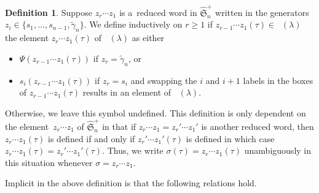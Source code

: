 \documentclass[10pt,a4paper]{amsart}
\numberwithin{equation}{section}
\theoremstyle{definition}
\newtheorem{Definition}[Theorem]{Definition}
\DeclareMathOperator{\PSYT}{\mathrm{PSYT}_{\geq 0}}
\begin{document}
\begin{Definition}\label{action of extended affine permutations of PSYT}
 Suppose $z_r\cdots z_1$ is a~reduced word in $\widehat{\mathfrak{S}}_n^{+}$ written in the generators $z_i \in \{s_1,\dots, s_{n-1},\widetilde{\gamma}_n\}$. We define inductively on $r \geq 1$ if $z_{r-1}\cdots z_1(\tau) \in \PSYT(\lambda)$ the element $z_r\cdots z_1(\tau)$ of $\PSYT(\lambda)$ as either
 \begin{itemize}
\itemsep=0pt
 \item $\Psi(z_{r-1}\cdots z_1(\tau))$ if $z_r = \widetilde{\gamma}_n$, or
 \item $s_i(z_{r-1}\cdots z_1(\tau))$ if $z_r = s_i$ and swapping the $i$ and $i+1$ labels in the boxes of $z_{r-1}\cdots z_1(\tau)$ results in an element of $\PSYT(\lambda)$.
 \end{itemize}
 Otherwise, we leave this symbol undefined. This definition is only dependent on the element~${z_r\cdots z_1}$ of $\widehat{\mathfrak{S}}_n^{+}$ in that if $z_r\cdots z_1 = z_r'\cdots z_1'$ is another reduced word, then $z_r\cdots z_1(\tau)$ is defined if and only if $z_r'\cdots z_1'(\tau)$ is defined in which case $z_r\cdots z_1(\tau) = z_r'\cdots z_1'(\tau)$. Thus, we write $\sigma(\tau) = z_r\cdots z_1(\tau)$ unambiguously in this situation whenever $\sigma = z_r\cdots z_1$.
\end{Definition}

Implicit in the above definition is that the following relations hold.
\end{document}
